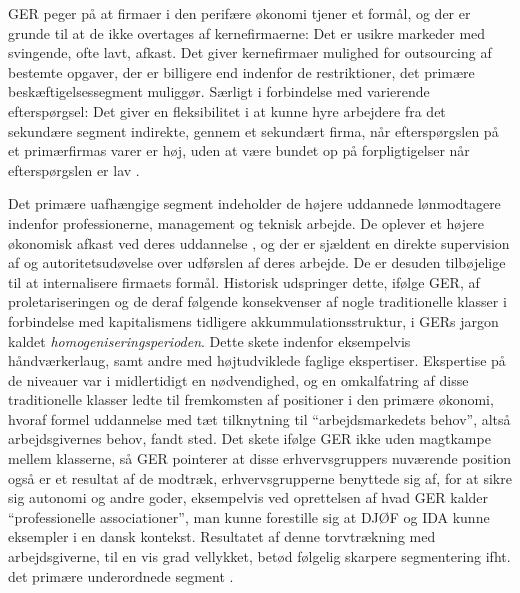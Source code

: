 GER peger på at firmaer i den perifære økonomi tjener et formål, og der er grunde til at de ikke overtages af kernefirmaerne: Det er usikre markeder med svingende, ofte lavt, afkast. Det giver kernefirmaer mulighed for outsourcing af bestemte opgaver, der er billigere end indenfor de restriktioner, det primære beskæftigelsessegment muliggør. Særligt i forbindelse med varierende efterspørgsel: Det giver en fleksibilitet i at kunne hyre arbejdere fra det sekundære segment indirekte, gennem et sekundært firma, når efterspørgslen på et primærfirmas varer er høj, uden at være bundet op på forpligtigelser når efterspørgslen er lav \parencite[191]{Gordon1982}. 

Det primære uafhængige segment \label{GER kontrol og intern arb marked} indeholder de højere uddannede lønmodtagere indenfor professionerne, management og teknisk arbejde. De oplever et højere økonomisk afkast ved deres uddannelse%
% 
%
, og der er sjældent en direkte supervision af og autoritetsudøvelse over udførslen af deres arbejde. De er desuden tilbøjelige til at internalisere firmaets formål. 
Historisk udspringer dette, ifølge GER, af proletariseringen og de deraf følgende konsekvenser af nogle traditionelle klasser i forbindelse med kapitalismens tidligere akkummulationsstruktur, i GERs jargon kaldet \emph{homogeniseringsperioden}.  Dette skete indenfor eksempelvis håndværkerlaug, samt andre med højtudviklede faglige ekspertiser. Ekspertise på de niveauer var i midlertidigt en nødvendighed, og en omkalfatring af disse traditionelle klasser ledte til fremkomsten af positioner i den primære økonomi, hvoraf formel uddannelse med tæt tilknytning til “arbejdsmarkedets behov”, altså arbejdsgivernes behov, fandt sted. Det skete  ifølge GER ikke uden magtkampe mellem klasserne, så GER pointerer at disse erhvervsgruppers nuværende position også er et resultat af de modtræk, erhvervsgrupperne benyttede sig af, for at sikre sig autonomi og andre goder, eksempelvis ved oprettelsen af hvad GER kalder “professionelle associationer”, man kunne forestille sig at DJØF og IDA kunne eksempler i en dansk kontekst. Resultatet af denne torvtrækning med arbejdsgiverne, til en vis grad vellykket, betød følgelig skarpere segmentering ifht. det primære underordnede segment \parencite[202f]{Gordon1982}.

